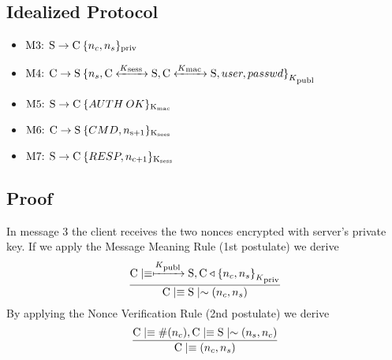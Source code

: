 \subsection{Idealized Protocol}
\begin{itemize}
\item \(\textnormal{M3: S} \rightarrow \textnormal{C} \: \lbrace n_c,n_s \rbrace \textsubscript{priv}\)
\item \(\textnormal{M4: C} \rightarrow \textnormal{S} \: { \{ n_s,\textnormal{C} \xleftrightarrow{K\textsubscript{sess }} \textnormal{S},\textnormal{C} \xleftrightarrow{K\textsubscript{mac }} \textnormal{S},user,passwd \} }_{K\textsubscript{publ}}\)
\item \(\textnormal{M5: S} \rightarrow \textnormal{C} \: \lbrace AUTH\:OK \rbrace \textsubscript{K\textsubscript{mac}}\)
\item \(\textnormal{M6: C} \rightarrow \textnormal{S} \: \lbrace CMD,n\textsubscript{s+1} \rbrace \textsubscript{K\textsubscript{sees}}\)
\item \(\textnormal{M7: S} \rightarrow \textnormal{C} \: \lbrace RESP,n\textsubscript{c+1} \rbrace \textsubscript{K\textsubscript{sess}}\)
\end{itemize}

\subsection{Proof}
In message 3 the client receives the two nonces encrypted with server's private key. If we apply the Message Meaning Rule (1st postulate) we derive
\[ \frac{\textnormal{C} \mid\equiv \xmapsto{K\textsubscript{publ}} \textnormal{S}, \textnormal{C} \triangleleft { \{ n_c,n_s \} }_{K\textsubscript{priv}}}
        {\textnormal{C} \mid\equiv \textnormal{S} \mid\sim (n_c,n_s)}\]
By applying the Nonce Verification Rule (2nd postulate) we derive
\[ \frac{\textnormal{C} \mid\equiv \#(n_c), \textnormal{C} \mid\equiv \textnormal{S} \mid\sim (n_s,n_c)}{\textnormal{C} \mid\equiv (n_c,n_s)}\]

